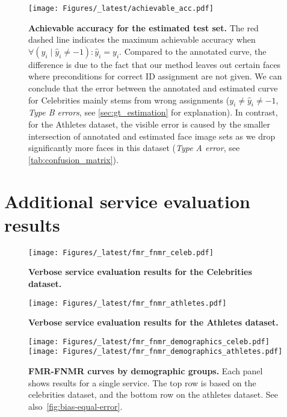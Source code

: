 \documentclass[10pt,twocolumn,letterpaper]{article}
\begin{document}
\begin{appendices}
\begin{figure}[ht!]
\centering
\texttt{[image: Figures/\_latest/achievable\_acc.pdf]}
\caption{{\bf Achievable accuracy for the estimated test set.} The red dashed line indicates the maximum achievable accuracy when $\forall (\hat{y}_i \mid \hat{y}_i \neq -1): \hat{y}_i = y_i$. Compared to the annotated curve, the difference is due to the fact that our method leaves out certain faces where preconditions for correct ID assignment are not given. We can conclude that the error between the annotated and estimated curve for Celebrities mainly stems from wrong assignments ($y_i \neq \hat{y}_i \neq -1$, {\em Type B errors}, see \cref{sec:gt_estimation} for explanation). In contrast, for the Athletes dataset, the visible error is caused by the smaller intersection of annotated and estimated face image sets as we drop significantly more faces in this dataset ({\em Type A error}, see \cref{tab:confusion_matrix}).}
\label{fig:achievable-acc}
\end{figure}

\clearpage
\section{Additional service evaluation results}
\label{appendix:additional-results}

\begin{figure*}[ht!]
    \centering
\texttt{[image: Figures/\_latest/fmr\_fnmr\_celeb.pdf]}
    \caption{{\bf Verbose service evaluation results for the Celebrities dataset.}}
    \label{fig:results-all-celeb}
\end{figure*}

\begin{figure*}[ht!]
    \centering \texttt{[image: Figures/\_latest/fmr\_fnmr\_athletes.pdf]}
    \caption{{\bf Verbose service evaluation results for the Athletes dataset.}}
    \label{fig:results-all-athletes}
\end{figure*}

\begin{figure*}[ht!]
    \centering
  \texttt{[image: Figures/\_latest/fmr\_fnmr\_demographics\_celeb.pdf]}
  \texttt{[image: Figures/\_latest/fmr\_fnmr\_demographics\_athletes.pdf]}
  \caption{{\bf FMR-FNMR curves by demographic groups.} Each panel shows results for a single service. The top row is based on the celebrities dataset, and the bottom row on the athletes dataset. See also~\cref{fig:bias-equal-error}.
  }
  \label{fig:bias}
\end{figure*}


\end{appendices}
\end{document}

